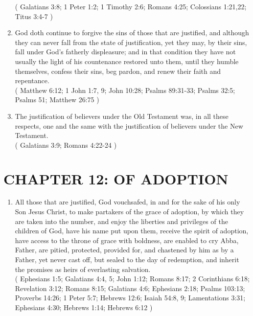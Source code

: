 \documentclass[12pt,a4paper]{book}
\begin{document}
\begin{enumerate}
( Galatians 3:8; 1 Peter 1:2; 1 Timothy 2:6; Romans 4:25; Colossians 1:21,22; Titus 3:4-7 )
\item God doth continue to forgive the sins of those that are justified, and although they can never fall from the state of justification, yet they may, by their sins, fall under God's fatherly displeasure; and in that condition they have not usually the light of his countenance restored unto them, until they humble themselves, confess their sins, beg pardon, and renew their faith and repentance.\\
( Matthew 6:12; 1 John 1:7, 9; John 10:28; Psalms 89:31-33; Psalms 32:5; Psalms 51; Matthew 26:75 )
\item The justification of believers under the Old Testament was, in all these respects, one and the same with the justification of believers under the New Testament.\\
( Galatians 3:9; Romans 4:22-24 )
\end{enumerate}

\chapter{CHAPTER 12: OF ADOPTION}
\label{ch-adop}
\begin{enumerate}
\item All those that are justified, God vouchsafed, in and for the sake of his only Son Jesus Christ, to make partakers of the grace of adoption, by which they are taken into the number, and enjoy the liberties and privileges of the children of God, have his name put upon them, receive the spirit of adoption, have access to the throne of grace with boldness, are enabled to cry Abba, Father, are pitied, protected, provided for, and chastened by him as by a Father, yet never cast off, but sealed to the day of redemption, and inherit the promises as heirs of everlasting salvation.\\
( Ephesians 1:5; Galatians 4:4, 5; John 1:12; Romans 8:17; 2 Corinthians 6:18; Revelation 3:12; Romans 8:15; Galatians 4:6; Ephesians 2:18; Psalms 103:13; Proverbs 14:26; 1 Peter 5:7; Hebrews 12:6; Isaiah 54:8, 9; Lamentations 3:31; Ephesians 4:30; Hebrews 1:14; Hebrews 6:12 )
\end{enumerate}
\end{document}
